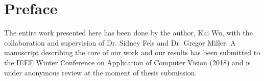 
\chapter{Preface}

The entire work presented here has been done by the author, Kai Wu, with the collaboration and supervision of Dr. Sidney Fels and Dr. Gregor Miller. A manuscript describing the core of our work and our results has been submitted to the IEEE Winter Conference on Application of Computer Vision (2018) and is under anonymous review at the moment of thesis submission.
